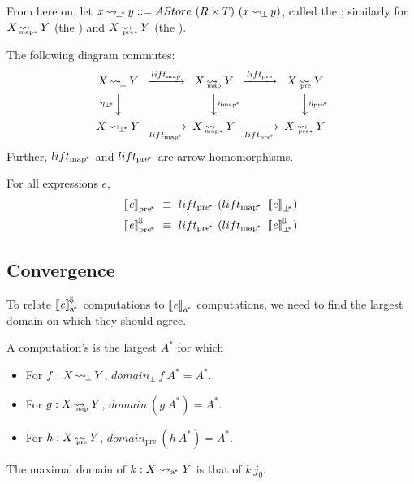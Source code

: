\documentclass[preprint]{sigplanconf}
\newcommand{\arrow}{\rightsquigarrow}
\newcommand{\conv}{^{\mspace{-2mu}\Downarrow\mspace{-2mu}}}
\newcommand{\meaningofconv}[1]{\left\llbracket{#1}\right\rrbracket\conv}
\newcommand{\arrowlift}{\ensuremath{lift}}
\newcommand{\genc}{_\mathrm{a^{\mspace{-2mu}*}}}
\DeclareMathOperator{\botto}{\arrow_{\mspace{-3mu}\bot}}
\newcommand{\map}{_\mathrm{map}}
\DeclareMathOperator{\mapto}{\arrow_{\mspace{-21mu}\map}}
\newcommand{\liftmap}{\arrowlift\map}
\newcommand{\pre}{_\mathrm{pre}}
\DeclareMathOperator{\preto}{\arrow_{\mspace{-19mu}\pre}}
\newcommand{\liftpre}{\arrowlift\pre}
\newcommand{\pbot}{{\bot^{\mspace{-4mu}*}}}
\DeclareMathOperator{\pbotto}{\arrow_{\mspace{-3mu}\pbot}}
\newcommand{\pmap}{_\mathrm{map^{\mspace{-2mu}*}}}
\DeclareMathOperator{\pmapto}{\arrow_{\mspace{-22mu}_{\mathrm{map*}}}}
\newcommand{\liftpmap}{\arrowlift\pmap}
\newcommand{\ppre}{_\mathrm{pre^{\mspace{-2mu}*}}}
\DeclareMathOperator{\ppreto}{\arrow_{\mspace{-19mu}_{\mathrm{pre*}}}}
\newcommand{\liftppre}{\arrowlift\ppre}
\begin{document}
From here on, let $x \pbotto y ::= AStore~(R \times T)~(x \botto y)$, called the ;
similarly for $X \pmapto Y$ (the ) and $X \ppreto Y$ (the ).

\begin{corollary}
The following diagram commutes:
\begin{equation}
\begin{CD}
X \botto Y   @>\liftmap>>   X \mapto Y   @>\liftpre>>   X \preto Y \\
@V{\eta_\pbot}VV             @VV{\eta\pmap}V              @VV{\eta\ppre}V\\
X \pbotto Y  @>>\liftpmap>  X \pmapto Y  @>>\liftppre>  X \ppreto Y
\end{CD}
\end{equation}
Further, $\liftpmap$ and $\liftppre$ are arrow homomorphisms.
\end{corollary}

\begin{corollary}
For all expressions $\mathit{e}$,
\begin{equation}
\begin{aligned}
	\meaningof{\mathit{e}}\ppre &\ \equiv \ \liftppre~(\liftpmap~\meaningof{\mathit{e}}_\pbot)
\\
	\meaningofconv{\mathit{e}}\ppre &\ \equiv \ \liftppre~(\liftpmap~\meaningofconv{\mathit{e}}_\pbot)
\end{aligned}
\end{equation}
\end{corollary}

\subsection{Convergence}

To relate $\meaningofconv{\mathit{e}}\genc$ computations to $\meaningof{\mathit{e}}\genc$ computations, we need to find the largest domain on which they should agree.

\begin{definition}
A computation's  is the largest $A^*$ for which
\begin{itemize}
	\item For $f : X \botto Y$, $domain_\bot~f~A^* = A^*$.
	\item For $g : X \mapto Y$, $domain~(g~A^*) = A^*$.
	\item For $h : X \preto Y$, $domain\pre~(h~A^*) = A^*$.
\end{itemize}
The maximal domain of $k : X \arrow\genc Y$ is that of $k~j_0$.
\label{def:maximal-domain}
\end{definition}
\end{document}

